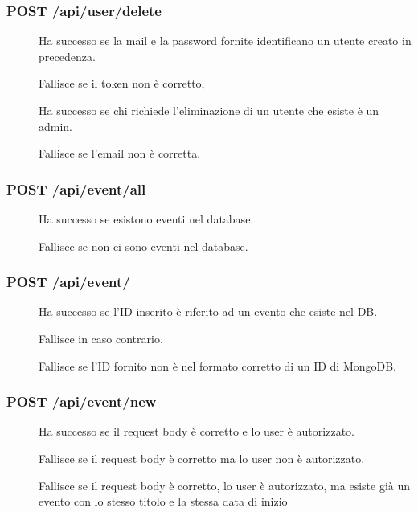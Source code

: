 \documentclass{article}
\begin{document}
\subsubsection{POST /api/user/delete}
\begin{description}
    \item[] Ha successo se la mail e la password fornite identificano un utente creato in precedenza.
    \item[] Fallisce se il token non è corretto,
    \item[] Ha successo se chi richiede l'eliminazione di un utente che esiste è un admin.
    \item[] Fallisce se l'email non è corretta.
\end{description}
\subsubsection{POST /api/event/all}
\begin{description}
    \item[] Ha successo se esistono eventi nel database.
    \item[] Fallisce se non ci sono eventi nel database.
\end{description}
\subsubsection{POST /api/event/}
\begin{description}
    \item[] Ha successo se l'ID inserito è riferito ad un evento che esiste nel DB.
    \item[] Fallisce in caso contrario.
    \item[] Fallisce se l'ID fornito non è nel formato corretto di un ID di MongoDB.
\end{description}
\subsubsection{POST /api/event/new}
\begin{description}
    \item[] Ha successo se il request body è corretto e lo user è autorizzato.
    \item[] Fallisce se il request body è corretto ma lo user non è autorizzato.
    \item[] Fallisce se il request body è corretto, lo user è autorizzato, ma esiste già un evento con lo stesso titolo e la stessa data di inizio
\end{description}
\end{document}
